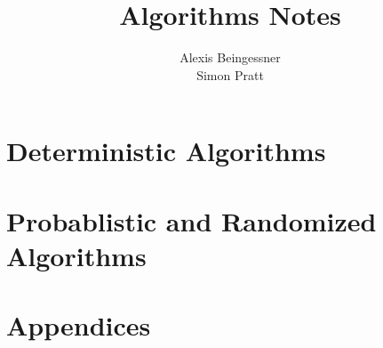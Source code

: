 \documentclass[11pt]{book}
\title{Algorithms Notes}
\date{}
\author{Alexis Beingessner\\Simon Pratt}
\theoremstyle{definition}
\begin{document}
\maketitle
\tableofcontents
\part{Deterministic Algorithms}
\begin{multicols}{2}
\end{multicols}
\part{Probablistic and Randomized Algorithms}
\begin{multicols}{2}
  
  
  
\end{multicols}
\part{Appendices}
\begin{multicols}{2}
  \appendix
\end{multicols}
\end{document}
